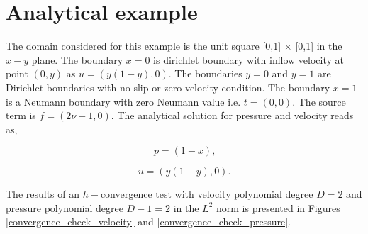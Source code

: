 \documentclass[a4paper,oneside,openright,spanish,english]{book}
\begin{document}
\section{Analytical example}

The domain considered for this example is the unit square [0,1] $\times$ [0,1] in the $x-y$ plane. 
The boundary ${x=0}$ is dirichlet boundary with inflow velocity at point $(0,y)$ as $u = (y(1-y), 0)$. The boundaries ${y = 0}$ and ${y = 1}$ are Dirichlet boundaries with no slip or zero velocity condition. The boundary ${x = 1}$ is a Neumann boundary with zero Neumann value i.e. $t = (0, 0)$. The source term is $f = (2 \nu - 1, 0)$. The analytical solution for pressure and velocity reads as,

\begin{center}

\begin{equation}
p = (1 - x) \textrm{,}
\end{equation}

\begin{equation} 
 u = (y(1-y), 0) \textrm{.}
\end{equation}

\end{center}

The results of an $h-$convergence test with velocity polynomial degree $D=2$ and pressure polynomial degree $D-1 = 2$ in the $L^2$ norm is presented in Figures \ref{convergence_check_velocity} and \ref{convergence_check_pressure}.
\end{document}
